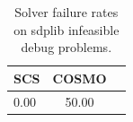\begin{table}
\centering
\caption{Solver failure rates on sdplib infeasible debug problems.}
\label{t-sdplib infeasible debug-failure}
\begin{tabular}{lcc}
\toprule
 SCS &  COSMO \\
\midrule
0.00 &  50.00 \\
\bottomrule
\end{tabular}
\end{table}
